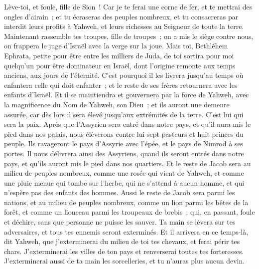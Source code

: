 \begin{multicols}{2}
Lève-toi, et foule, fille de Sion~! Car je te ferai une corne de fer, et te mettrai des ongles d'airain~; et tu écraseras des peuples nombreux, et tu consacreras par interdit leurs profits à Yahweh, et leurs richesses au Seigneur de toute la terre.
Maintenant rassemble tes troupes, fille de troupes~; on a mis le siège contre nous, on frappera le juge d'Israël avec la verge sur la joue.
\VerseOne{}Mais toi, Bethléhem Ephrata, petite pour être entre les milliers de Juda, de toi sortira pour moi quelqu'un pour être dominateur en Israël, dont l'origine remonte aux temps anciens, aux jours de l'éternité.
C'est pourquoi il les livrera jusqu'au temps où enfantera celle qui doit enfanter~; et le reste de ses frères retournera avec les enfants d'Israël.
Et il se maintiendra et gouvernera par la force de Yahweh, avec la magnificence du Nom de Yahweh, son Dieu~; et ils auront une demeure assurée, car dès lors il sera élevé jusqu'aux extrémités de la terre.
C'est lui qui sera la paix. Après que l'Assyrien sera entré dans notre pays, et qu'il aura mis le pied dans nos palais, nous élèverons contre lui sept pasteurs et huit princes du peuple.
Ils ravageront le pays d'Assyrie avec l'épée, et le pays de Nimrod à ses portes. Il nous délivrera ainsi des Assyriens, quand ils seront entrés dans notre pays, et qu'ils auront mis le pied dans nos quartiers.
Et le reste de Jacob sera au milieu de peuples nombreux, comme une rosée qui vient de Yahweh, et comme une pluie menue qui tombe sur l'herbe, qui ne s'attend à aucun homme, et qui n'espère pas des enfants des hommes.
Aussi le reste de Jacob sera parmi les nations, et au milieu de peuples nombreux, comme un lion parmi les bêtes de la forêt, et comme un lionceau parmi les troupeaux de brebis~; qui, en passant, foule et déchire, sans que personne ne puisse les sauver.
Ta main se lèvera sur tes adversaires, et tous tes ennemis seront exterminés.
Et il arrivera en ce temps-là, dit Yahweh, que j'exterminerai du milieu de toi tes chevaux, et ferai périr tes chars.
J'exterminerai les villes de ton pays et renverserai toutes tes forteresses.
J'exterminerai aussi de ta main les sorcelleries, et tu n'auras plus aucun devin.

\end{multicols}
